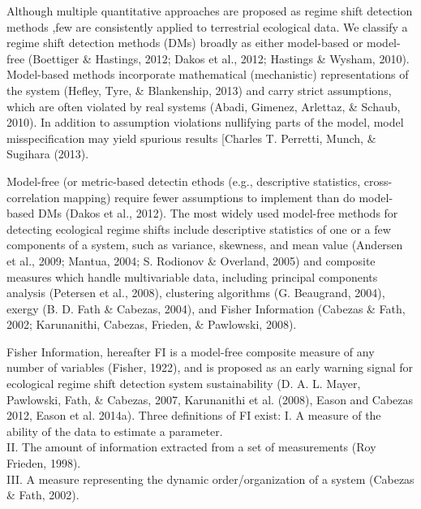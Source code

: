 \documentclass[12pt,twoside,openany]{reedthesis}
\begin{document}
Although multiple quantitative approaches are proposed as regime shift
detection methods ,few are consistently applied to terrestrial
ecological data. We classify a regime shift detection methods (DMs)
broadly as either model-based or model-free (Boettiger \& Hastings,
2012; Dakos et al., 2012; Hastings \& Wysham, 2010). Model-based methods
incorporate mathematical (mechanistic) representations of the system
(Hefley, Tyre, \& Blankenship, 2013) and carry strict assumptions, which
are often violated by real systems (Abadi, Gimenez, Arlettaz, \& Schaub,
2010). In addition to assumption violations nullifying parts of the
model, model misspecification may yield spurious results {[}Charles T.
Perretti, Munch, \& Sugihara (2013).

Model-free (or metric-based detectin ethods (e.g., descriptive
statistics, cross-correlation mapping) require fewer assumptions to
implement than do model-based DMs (Dakos et al., 2012). The most widely
used model-free methods for detecting ecological regime shifts include
descriptive statistics of one or a few components of a system, such as
variance, skewness, and mean value (Andersen et al., 2009; Mantua, 2004;
S. Rodionov \& Overland, 2005) and composite measures which handle
multivariable data, including principal components analysis (Petersen et
al., 2008), clustering algorithms (G. Beaugrand, 2004), exergy (B. D.
Fath \& Cabezas, 2004), and Fisher Information (Cabezas \& Fath, 2002;
Karunanithi, Cabezas, Frieden, \& Pawlowski, 2008).

Fisher Information, hereafter FI is a model-free composite measure of
any number of variables (Fisher, 1922), and is proposed as an early
warning signal for ecological regime shift detection system
sustainability (D. A. L. Mayer, Pawlowski, Fath, \& Cabezas, 2007,
Karunanithi et al. (2008), Eason and Cabezas 2012, Eason et al. 2014a).
Three definitions of FI exist: I. A measure of the ability of the data
to estimate a parameter.\\
II. The amount of information extracted from a set of measurements (Roy
Frieden, 1998).\\
III. A measure representing the dynamic order/organization of a system
(Cabezas \& Fath, 2002).
\end{document}

